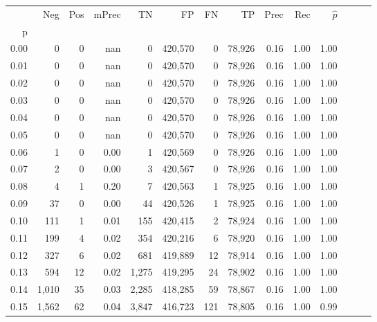 \begin{tabular}{rrrrrrrrrrrrrr}
\toprule
{} &     Neg &    Pos & mPrec &       TN &       FP &      FN &      TP &  Prec &   Rec & $\hat{p}$ \\
p    &         &        &       &          &          &         &         &       &       &           \\
\midrule
0.00 &       0 &      0 &   nan &        0 &  420,570 &       0 &  78,926 &  0.16 &  1.00 &      1.00 \\
0.01 &       0 &      0 &   nan &        0 &  420,570 &       0 &  78,926 &  0.16 &  1.00 &      1.00 \\
0.02 &       0 &      0 &   nan &        0 &  420,570 &       0 &  78,926 &  0.16 &  1.00 &      1.00 \\
0.03 &       0 &      0 &   nan &        0 &  420,570 &       0 &  78,926 &  0.16 &  1.00 &      1.00 \\
0.04 &       0 &      0 &   nan &        0 &  420,570 &       0 &  78,926 &  0.16 &  1.00 &      1.00 \\
0.05 &       0 &      0 &   nan &        0 &  420,570 &       0 &  78,926 &  0.16 &  1.00 &      1.00 \\
0.06 &       1 &      0 &  0.00 &        1 &  420,569 &       0 &  78,926 &  0.16 &  1.00 &      1.00 \\
0.07 &       2 &      0 &  0.00 &        3 &  420,567 &       0 &  78,926 &  0.16 &  1.00 &      1.00 \\
0.08 &       4 &      1 &  0.20 &        7 &  420,563 &       1 &  78,925 &  0.16 &  1.00 &      1.00 \\
0.09 &      37 &      0 &  0.00 &       44 &  420,526 &       1 &  78,925 &  0.16 &  1.00 &      1.00 \\
0.10 &     111 &      1 &  0.01 &      155 &  420,415 &       2 &  78,924 &  0.16 &  1.00 &      1.00 \\
0.11 &     199 &      4 &  0.02 &      354 &  420,216 &       6 &  78,920 &  0.16 &  1.00 &      1.00 \\
0.12 &     327 &      6 &  0.02 &      681 &  419,889 &      12 &  78,914 &  0.16 &  1.00 &      1.00 \\
0.13 &     594 &     12 &  0.02 &    1,275 &  419,295 &      24 &  78,902 &  0.16 &  1.00 &      1.00 \\
0.14 &   1,010 &     35 &  0.03 &    2,285 &  418,285 &      59 &  78,867 &  0.16 &  1.00 &      1.00 \\
0.15 &   1,562 &     62 &  0.04 &    3,847 &  416,723 &     121 &  78,805 &  0.16 &  1.00 &      0.99 \\

\end{tabular}
